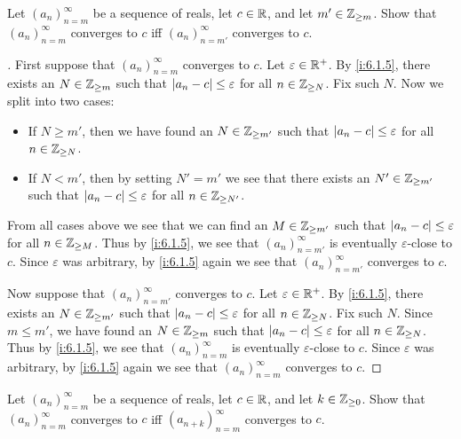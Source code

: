 \begin{ex}\label{i:ex:6.1.3}
  Let \((a_n)_{n = m}^\infty\) be a sequence of reals, let \(c \in \mathbb{R}\), and let \(m' \in \mathbb{Z}_{\geq m}\).
  Show that \((a_n)_{n = m}^\infty\) converges to \(c\) iff \((a_n)_{n = m'}^\infty\) converges to \(c\).
\end{ex}

\begin{proof}[]
  First suppose that \((a_n)_{n = m}^\infty\) converges to \(c\).
  Let \(\varepsilon \in \mathbb{R}^+\).
  By \cref{i:6.1.5}, there exists an \(N \in \mathbb{Z}_{\geq m}\) such that \(\left\lvert a_n - c\right\rvert \leq \varepsilon\) for all \(n \in \mathbb{Z}_{\geq N}\).
  Fix such \(N\).
  Now we split into two cases:
  \begin{itemize}
    \item If \(N \geq m'\), then we have found an \(N \in \mathbb{Z}_{\geq m'}\) such that \(\left\lvert a_n - c\right\rvert \leq \varepsilon\) for all \(n \in \mathbb{Z}_{\geq N}\).
    \item If \(N < m'\), then by setting \(N' = m'\) we see that there exists an \(N' \in \mathbb{Z}_{\geq m'}\) such that \(\left\lvert a_n - c\right\rvert \leq \varepsilon\) for all \(n \in \mathbb{Z}_{\geq N'}\).
  \end{itemize}
  From all cases above we see that we can find an \(M \in \mathbb{Z}_{\geq m'}\) such that \(\left\lvert a_n - c\right\rvert \leq \varepsilon\) for all \(n \in \mathbb{Z}_{\geq M}\).
  Thus by \cref{i:6.1.5}, we see that \((a_n)_{n = m'}^\infty\) is eventually \(\varepsilon\)-close to \(c\).
  Since \(\varepsilon\) was arbitrary, by \cref{i:6.1.5} again we see that \((a_n)_{n = m'}^\infty\) converges to \(c\).

  Now suppose that \((a_n)_{n = m'}^\infty\) converges to \(c\).
  Let \(\varepsilon \in \mathbb{R}^+\).
  By \cref{i:6.1.5}, there exists an \(N \in \mathbb{Z}_{\geq m'}\) such that \(\left\lvert a_n - c\right\rvert \leq \varepsilon\) for all \(n \in \mathbb{Z}_{\geq N}\).
  Fix such \(N\).
  Since \(m \leq m'\), we have found an \(N \in \mathbb{Z}_{\geq m}\) such that \(\left\lvert a_n - c\right\rvert \leq \varepsilon\) for all \(n \in \mathbb{Z}_{\geq N}\).
  Thus by \cref{i:6.1.5}, we see that \((a_n)_{n = m}^\infty\) is eventually \(\varepsilon\)-close to \(c\).
  Since \(\varepsilon\) was arbitrary, by \cref{i:6.1.5} again we see that \((a_n)_{n = m}^\infty\) converges to \(c\).
\end{proof}

\begin{ex}\label{i:ex:6.1.4}
  Let \((a_n)_{n = m}^\infty\) be a sequence of reals, let \(c \in \mathbb{R}\), and let \(k \in \mathbb{Z}_{\geq 0}\).
  Show that \((a_n)_{n = m}^\infty\) converges to \(c\) iff \((a_{n + k})_{n = m}^\infty\) converges to \(c\).
\end{ex}

